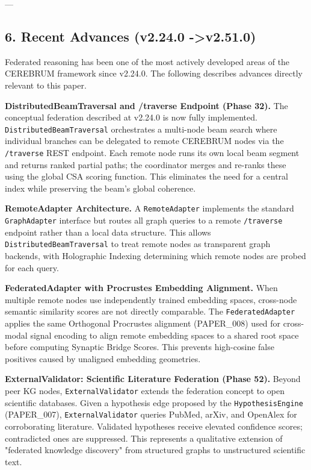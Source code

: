 ---

\subsection{6. Recent Advances (v2.24.0 -\textgreater  v2.51.0)}

Federated reasoning has been one of the most actively developed areas of the CEREBRUM framework since v2.24.0. The following describes advances directly relevant to this paper.

\textbf{Distri\-butedBeamTraversal and /traverse Endpoint (Phase 32).} The conceptual federation described at v2.24.0 is now fully implemented. \texttt{DistributedBeamTraversal} orche\-strates a multi-node beam search where individual branches can be delegated to remote CEREBRUM nodes via the \texttt{/traverse} REST endpoint. Each remote node runs its own local beam segment and returns ranked partial paths; the coordinator merges and re-ranks these using the global CSA scoring function. This eliminates the need for a central index while preserving the beam's global coherence.

\textbf{RemoteAdapter Archit\-ecture.} A \texttt{RemoteAdapter} implements the standard \texttt{GraphAdapter} interface but routes all graph queries to a remote \texttt{/traverse} endpoint rather than a local data structure. This allows \texttt{DistributedBeamTraversal} to treat remote nodes as transparent graph backends, with Holographic Indexing determining which remote nodes are probed for each query.

\textbf{FederatedAdapter with Procrustes Embedding Alignment.} When multiple remote nodes use indep\-endently trained embedding spaces, cross-node semantic similarity scores are not directly comparable. The \texttt{FederatedAdapter} applies the same Orthogonal Procrustes alignment (PAPER\_008) used for cross-modal signal encoding to align remote embedding spaces to a shared root space before computing Synaptic Bridge Scores. This prevents high-cosine false positives caused by unaligned embedding geometries.

\textbf{ExternalValidator: Scientific Literature Federation (Phase 52).} Beyond peer KG nodes, \texttt{ExternalValidator} extends the federation concept to open scientific databases. Given a hypothesis edge proposed by the \texttt{HypothesisEngine} (PAPER\_007), \texttt{ExternalValidator} queries PubMed, arXiv, and OpenAlex for corro\-borating literature. Validated hypotheses receive elevated confidence scores; contr\-adicted ones are suppressed. This represents a qualitative extension of "federated knowledge discovery" from structured graphs to unstr\-uctured scientific text.

